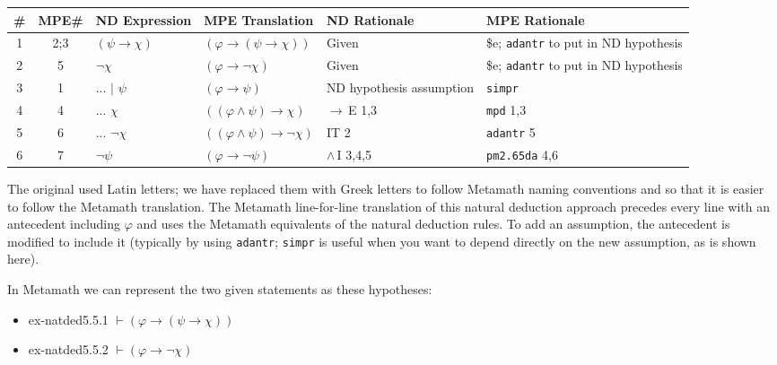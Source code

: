 {\setlength{\extrarowsep}{4pt} %
\begin{longtabu}   { @{} c c X X X X }
\textbf{\#} & \textbf{MPE\#} & \textbf{ND Ex\-pres\-sion} &
\textbf{MPE Trans\-lation} & \textbf{ND Ration\-ale} &
\textbf{MPE Ra\-tio\-nale} \\
\endhead

1 & 2;3 &
$( \psi \rightarrow \chi )$ &
$( \varphi \rightarrow ( \psi \rightarrow \chi ) )$ &
Given &
\$e; \texttt{adantr} to put in ND hypothesis \\

2 & 5 &
$ \lnot \chi$ &
$( \varphi \rightarrow \lnot \chi )$ &
Given &
\$e; \texttt{adantr} to put in ND hypothesis \\

3 & 1 &
... $\vert$ $\psi$ &
$( \varphi \rightarrow \psi )$ &
ND hypothesis assumption &
\texttt{simpr} \\

4 & 4 &
... $\chi$ &
$( ( \varphi \land \psi ) \rightarrow \chi )$ &
$\rightarrow$\,E 1,3 &
\texttt{mpd} 1,3 \\

5 & 6 &
... $\lnot \chi$ &
$( ( \varphi \land \psi ) \rightarrow \lnot \chi )$ &
IT 2 &
\texttt{adantr} 5 \\

6 & 7 &
$\lnot \psi$ &
$( \varphi \rightarrow \lnot \psi )$ &
$\land$\,I 3,4,5 &
\texttt{pm2.65da} 4,6 \\

\end{longtabu}
}


The original used Latin letters; we have replaced them with Greek letters
to follow Metamath naming conventions and so that it is easier to follow
the Metamath translation. The Metamath line-for-line translation of
this natural deduction approach precedes every line with an antecedent
including $\varphi$ and uses the Metamath equivalents of the natural deduction
rules. To add an assumption, the antecedent is modified to include it
(typically by using \texttt{adantr};
\texttt{simpr} is useful when you want to
depend directly on the new assumption, as is shown here).

In Metamath we can represent the two given statements as these hypotheses:

\begin{itemize}
\item ex-natded5.5.1 $\vdash ( \varphi \rightarrow ( \psi \rightarrow \chi ) )$
\item ex-natded5.5.2 $\vdash ( \varphi \rightarrow \lnot \chi )$
\end{itemize}

